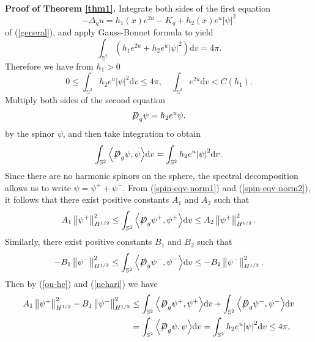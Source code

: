 \documentclass[a4paper, 12pt]{article}
\def\slashiii#1{\setbox0=\hbox{$#1$}#1\hskip-\wd0\hbox to\wd0{\hss\sl/\/\hss}}
\begin{document}
\

\noindent\textbf{Proof of Theorem \ref{thm1}.}  Integrate both sides of the first equation
\begin{equation*}
	{ - {\Delta _g}u = h_1(x){e^{2u}} - {K_g} + h_2(x){e^u}{{\left| \psi  \right|}^2}}
\end{equation*}
of (\ref{general}), and apply Gauss-Bonnet formula to yield
\begin{equation}\label{stokes}
	\int_{{\mathbb{S}^2}} {\left( {{h_1}{e^{2u}} + h_2{e^{u}}{{\left| \psi  \right|}^2}} \right)} {\text{d}{v}} = 4\pi .
\end{equation}
Therefore we have from $h_1>0$
\begin{equation}\label{ou-he}
	0 \leq \int_{{\mathbb{S}^2}} h_2{{e^u}} {\left| \psi  \right|^2}{\text{d}}v \leq 4\pi,\quad \int_{{\mathbb{S}^2}} {{e^{2u}}}  {\text{d}}v < C\left(h_1 \right) .
\end{equation}
Multiply both sides of the second equation
\begin{equation*}
	\slashiii{D}_g\psi  = h_2{e^{u}}\psi.
\end{equation*}
by the spinor $\psi$, and then take integration to obtain
\begin{equation}\label{nehari}
	\int_{{\mathbb{S}^2}} {\left\langle {\slashiii{D}_g\psi ,\psi } \right\rangle } {\text{d}{v}} = \int_{{\mathbb{S}^2}}h_2 {{e^{u}}{{\left| \psi  \right|}^2}} {\text{d}{v}}.
\end{equation}
Since there are no harmonic spinors on the sphere, the spectral decomposition allows us to write \( \psi = \psi^+ + \psi^- \). From (\ref{spin-eqv-norm1}) and (\ref{spin-eqv-norm2}), it follows that there exist positive constants $A_1$ and $A_2$ such that
\begin{equation}\label{pos-spin}
	{A_1}\left\| {{\psi ^ + }} \right\|_{{H^{1/2}}}^2 \leq \int_{{{\mathbb{S}^2}}} {\left\langle {\slashiii{D}_g{\psi ^ + },{\psi ^ + }} \right\rangle } {\text{d}}v \leq {A_2}\left\| {{\psi ^ + }} \right\|_{{H^{1/2}}}^2.
\end{equation}
Similarly, there exist positive constants \( B_1 \) and \( B_2 \) such that
\begin{equation}\label{neg-spin}
	-{B_1}\left\| {{\psi ^ - }} \right\|_{{H^{1/2}}}^2 \leq \int_{{{\mathbb{S}^2}}} {\left\langle {\slashiii{D}_g{\psi ^ - },{\psi ^ - }} \right\rangle } {\text{d}}v \leq {-B_2}\left\| {{\psi ^ - }} \right\|_{{H^{1/2}}}^2.
\end{equation}
Then by (\ref{ou-he}) and (\ref{nehari}) we have
\[\begin{aligned}
	{A_1}\left\| {{\psi ^ + }} \right\|_{{H^{1/2}}}^2 - {B_1}\left\| {{\psi ^ - }} \right\|_{{H^{1/2}}}^2
	&\leq \int_{{{\mathbb{S}^2}}} {\left\langle {\slashiii{D}_g{\psi ^ + },{\psi ^ + }} \right\rangle } {\text{d}}v + \int_{{{\mathbb{S}^2}}} {\left\langle {\slashiii{D}_g{\psi ^ - },{\psi ^ - }} \right\rangle } {\text{d}}v  \\
	&= \int_{{\mathbb{S}^2}} {\left\langle {\slashiii{D}_g\psi ,\psi } \right\rangle } {\text{d}}v = \int_{{\mathbb{S}^2}} h_2{{e^u}} {\left| \psi  \right|^2}{\text{d}}v \leq 4\pi,
\end{aligned}
\]
\end{document}
